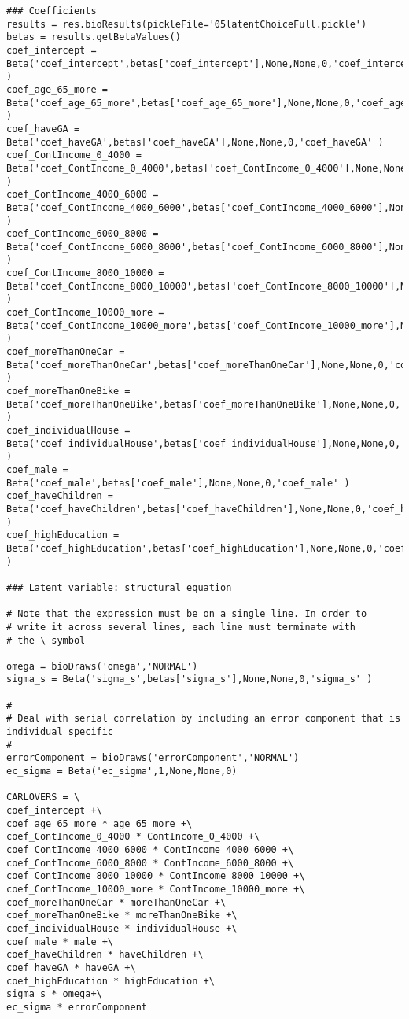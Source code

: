 \documentclass[12pt,a4paper]{article}
\begin{document}
\begin{lstlisting}[style=numbers]
### Coefficients
results = res.bioResults(pickleFile='05latentChoiceFull.pickle')
betas = results.getBetaValues()
coef_intercept = Beta('coef_intercept',betas['coef_intercept'],None,None,0,'coef_intercept' )
coef_age_65_more = Beta('coef_age_65_more',betas['coef_age_65_more'],None,None,0,'coef_age_65_more' )
coef_haveGA = Beta('coef_haveGA',betas['coef_haveGA'],None,None,0,'coef_haveGA' )
coef_ContIncome_0_4000 = Beta('coef_ContIncome_0_4000',betas['coef_ContIncome_0_4000'],None,None,0,'coef_ContIncome_0_4000' )
coef_ContIncome_4000_6000 = Beta('coef_ContIncome_4000_6000',betas['coef_ContIncome_4000_6000'],None,None,0,'coef_ContIncome_4000_6000' )
coef_ContIncome_6000_8000 = Beta('coef_ContIncome_6000_8000',betas['coef_ContIncome_6000_8000'],None,None,0,'coef_ContIncome_6000_8000' )
coef_ContIncome_8000_10000 = Beta('coef_ContIncome_8000_10000',betas['coef_ContIncome_8000_10000'],None,None,0,'coef_ContIncome_8000_10000' )
coef_ContIncome_10000_more = Beta('coef_ContIncome_10000_more',betas['coef_ContIncome_10000_more'],None,None,0,'coef_ContIncome_10000_more' )
coef_moreThanOneCar = Beta('coef_moreThanOneCar',betas['coef_moreThanOneCar'],None,None,0,'coef_moreThanOneCar' )
coef_moreThanOneBike = Beta('coef_moreThanOneBike',betas['coef_moreThanOneBike'],None,None,0,'coef_moreThanOneBike' )
coef_individualHouse = Beta('coef_individualHouse',betas['coef_individualHouse'],None,None,0,'coef_individualHouse' )
coef_male = Beta('coef_male',betas['coef_male'],None,None,0,'coef_male' )
coef_haveChildren = Beta('coef_haveChildren',betas['coef_haveChildren'],None,None,0,'coef_haveChildren' )
coef_highEducation = Beta('coef_highEducation',betas['coef_highEducation'],None,None,0,'coef_highEducation' )

### Latent variable: structural equation

# Note that the expression must be on a single line. In order to 
# write it across several lines, each line must terminate with 
# the \ symbol

omega = bioDraws('omega','NORMAL')
sigma_s = Beta('sigma_s',betas['sigma_s'],None,None,0,'sigma_s' )

#
# Deal with serial correlation by including an error component that is individual specific
#
errorComponent = bioDraws('errorComponent','NORMAL')
ec_sigma = Beta('ec_sigma',1,None,None,0)

CARLOVERS = \
coef_intercept +\
coef_age_65_more * age_65_more +\
coef_ContIncome_0_4000 * ContIncome_0_4000 +\
coef_ContIncome_4000_6000 * ContIncome_4000_6000 +\
coef_ContIncome_6000_8000 * ContIncome_6000_8000 +\
coef_ContIncome_8000_10000 * ContIncome_8000_10000 +\
coef_ContIncome_10000_more * ContIncome_10000_more +\
coef_moreThanOneCar * moreThanOneCar +\
coef_moreThanOneBike * moreThanOneBike +\
coef_individualHouse * individualHouse +\
coef_male * male +\
coef_haveChildren * haveChildren +\
coef_haveGA * haveGA +\
coef_highEducation * highEducation +\
sigma_s * omega+\
ec_sigma * errorComponent



\end{lstlisting}
\end{document}
